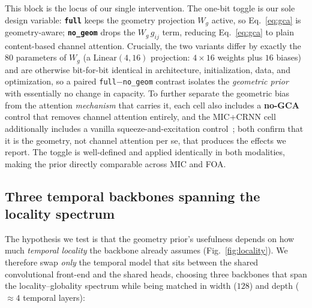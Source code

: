 This block is the locus of our single intervention. The one-bit toggle is our
sole design variable: \textbf{\texttt{full}} keeps the geometry projection $W_g$
active, so Eq.~\eqref{eq:gca} is geometry-aware; \textbf{\texttt{no\_geom}} drops
the $W_g\,g_{ij}$ term, reducing Eq.~\eqref{eq:gca} to plain content-based channel
attention. Crucially, the two variants differ by exactly the $80$ parameters of
$W_g$ (a $\mathrm{Linear}(4,16)$ projection: $4\times16$ weights plus $16$ biases)
and are otherwise bit-for-bit identical in architecture, initialization, data,
and optimization, so a paired \texttt{full}$-$\texttt{no\_geom} contrast isolates
the \emph{geometric prior} with essentially no change in capacity. To further
separate the geometric bias from the attention \emph{mechanism} that carries it,
each cell also includes a \textbf{no-GCA} control that removes channel attention
entirely, and the MIC+CRNN cell additionally includes a vanilla
squeeze-and-excitation control~\cite{hu2018senet}; both confirm that it is the
geometry, not channel attention per se, that produces the effects we report. The
toggle is well-defined and applied identically in both modalities, making the
prior directly comparable across MIC and FOA.

\subsection{Three temporal backbones spanning the locality spectrum}
\label{sec:arch}
The hypothesis we test is that the geometry prior's usefulness depends on how
much \emph{temporal locality} the backbone already assumes
(Fig.~\ref{fig:locality}). We therefore swap \emph{only} the temporal model that
sits between the shared convolutional front-end and the shared heads, choosing
three backbones that span the locality--globality spectrum while being matched in
width ($128$) and depth ($\approx\!4$ temporal layers):

